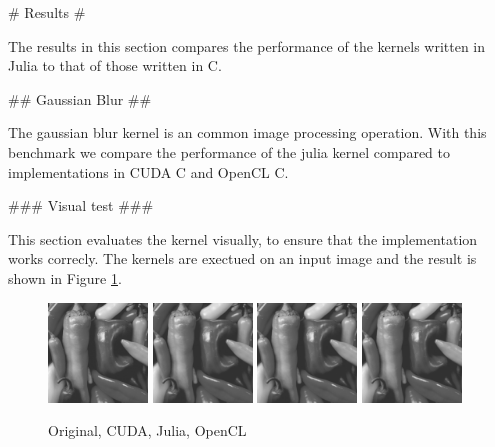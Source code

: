 \begin{markdown}

# Results #

The results in this section compares the performance of the kernels
written in Julia to that of those written in C. 

## Gaussian Blur ##

The gaussian blur kernel is an common image processing operation. With
this benchmark we compare the performance of the julia kernel compared
to implementations in CUDA C and OpenCL C.

### Visual test ###

This section evaluates the kernel visually, to ensure that the
implementation works correcly. The kernels are exectued on an input
image and the result is shown in Figure \ref{fig:res:blur:pic}.

\begin{figure}[H]
  \centering
  \includegraphics[width=100px]{body/figures/results/blur/input.png}
  \includegraphics[width=100px]{body/figures/results/blur/cuda.png}
  \includegraphics[width=100px]{body/figures/results/blur/julia.png}
  \includegraphics[width=100px]{body/figures/results/blur/opencl.png}
  \caption{Original, CUDA, Julia, OpenCL}
  \label{fig:res:blur:pic}
\end{figure}


\end{markdown}

